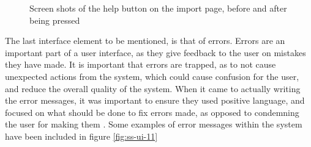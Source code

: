 \begin{figure}[ht!]
	\vspace{-1mm}
	\begin{center}
	\end{center}
	\vspace{-6mm}
	\captionsetup{justification=centering,margin=2cm}
	\caption{Screen shots of the help button on the import page, before and after being pressed}
	\label{fig:ss-ui-10}
\end{figure}

\noindent 
The last interface element to be mentioned, is that of errors. Errors are an important part of a user interface, as they give feedback to the user on mistakes they have made. It is important that errors are trapped, as to not cause unexpected actions from the system, which could cause confusion for the user, and reduce the overall quality of the system. When it came to actually writing the error messages, it was important to ensure they used positive language, and focused on what should be done to fix errors made, as opposed to condemning the user for making them \cite{shneiderman1982future}. Some examples of error messages within the system have been included in figure \ref{fig:ss-ui-11}

